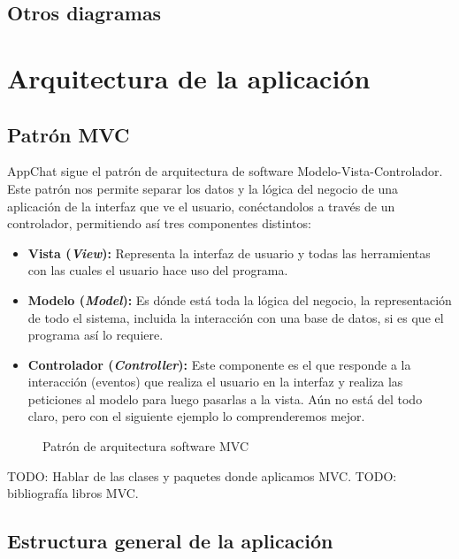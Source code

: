 \documentclass[11pt]{article}
\begin{document}
\subsection{Otros diagramas}

\section{Arquitectura de la aplicación}

\subsection{Patrón MVC}

AppChat sigue el patrón de arquitectura de software Modelo-Vista-Controlador. Este patrón nos permite separar los datos y la lógica del negocio de una aplicación de la interfaz que ve el usuario, conéctandolos a través de un controlador, permitiendo así tres componentes distintos:

\begin{itemize}
	\item \textbf{Vista (\textit{View}):} Representa la interfaz de usuario y todas las herramientas con las cuales el usuario hace uso del programa.
	
	\item \textbf{Modelo (\textit{Model}):} Es dónde está toda la lógica del negocio, la representación de todo el sistema, incluida la interacción con una base de datos, si es que el programa así lo requiere.
	
	\item \textbf{Controlador (\textit{Controller}):} Este componente es el que responde a la interacción (eventos) que realiza el usuario en la interfaz y realiza las peticiones al modelo para luego pasarlas a la vista. Aún no está del todo claro, pero con el siguiente ejemplo lo comprenderemos mejor.
\end{itemize}

\begin{figure}[H]
	\centering
	\scalebox{1.25}{
		
	}
	\caption{Patrón de arquitectura software MVC}
	\label{fig:mvc}
\end{figure}

TODO: Hablar de las clases y paquetes donde aplicamos MVC.
TODO: bibliografía libros MVC.

\subsection{Estructura general de la aplicación}
\end{document}
